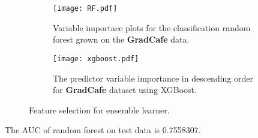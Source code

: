 \begin{figure}[htb]
    \centering
    \begin{subfigure}{.5\linewidth}
	\centering
	\texttt{[image: RF.pdf]}
	\caption{Variable importace plots for the classification random forest grown on the \textbf{GradCafe} data.}
	\label{fig:rf}
    \end{subfigure}%
    \begin{subfigure}{.5\linewidth}
    \centering
    \texttt{[image: xgboost.pdf]}
    \caption{The predictor variable importance in descending order for \textbf{GradCafe} dataset using XGBoost.}
    \label{fig: xgb}
\end{subfigure}
    \caption{Feature selection for  ensemble learner.}
\end{figure}
The AUC of random forest on test data is 0.7558307. 


